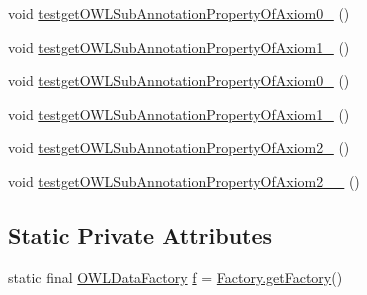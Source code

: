 \begin{DoxyCompactItemize}
void \hyperlink{classorg_1_1semanticweb_1_1owlapi_1_1api_1_1test_1_1_null_check_test_case_a37e82bb0492e7bde8e07a064db7b98d1}{testget\-O\-W\-L\-Sub\-Annotation\-Property\-Of\-Axiom0\-\_} ()
\item 
void \hyperlink{classorg_1_1semanticweb_1_1owlapi_1_1api_1_1test_1_1_null_check_test_case_ad712524fa5109c05dd792e93921cacd3}{testget\-O\-W\-L\-Sub\-Annotation\-Property\-Of\-Axiom1\-\_} ()
\item 
void \hyperlink{classorg_1_1semanticweb_1_1owlapi_1_1api_1_1test_1_1_null_check_test_case_a8f24a8717205f48c0aad9e2d3aa746e0}{testget\-O\-W\-L\-Sub\-Annotation\-Property\-Of\-Axiom0\-\_} ()
\item 
void \hyperlink{classorg_1_1semanticweb_1_1owlapi_1_1api_1_1test_1_1_null_check_test_case_aea57ee168e0815a707c2143befb7a451}{testget\-O\-W\-L\-Sub\-Annotation\-Property\-Of\-Axiom1\-\_} ()
\item 
void \hyperlink{classorg_1_1semanticweb_1_1owlapi_1_1api_1_1test_1_1_null_check_test_case_a1e5a6493bb9c4fe23caf72968e52e7be}{testget\-O\-W\-L\-Sub\-Annotation\-Property\-Of\-Axiom2\-\_} ()
\item 
void \hyperlink{classorg_1_1semanticweb_1_1owlapi_1_1api_1_1test_1_1_null_check_test_case_a8379c058f4530d22f674607b5c7d0cff}{testget\-O\-W\-L\-Sub\-Annotation\-Property\-Of\-Axiom2\-\_\-\_} ()
\end{DoxyCompactItemize}
\subsection*{Static Private Attributes}
\begin{DoxyCompactItemize}
\item 
static final \hyperlink{interfaceorg_1_1semanticweb_1_1owlapi_1_1model_1_1_o_w_l_data_factory}{O\-W\-L\-Data\-Factory} \hyperlink{classorg_1_1semanticweb_1_1owlapi_1_1api_1_1test_1_1_null_check_test_case_af869e690c159461d9416ec76fe334312}{f} = \hyperlink{classorg_1_1semanticweb_1_1owlapi_1_1api_1_1test_1_1_factory_aa13d980a9c54bf4d951e5d9b117646d6}{Factory.\-get\-Factory}()
\end{DoxyCompactItemize}


